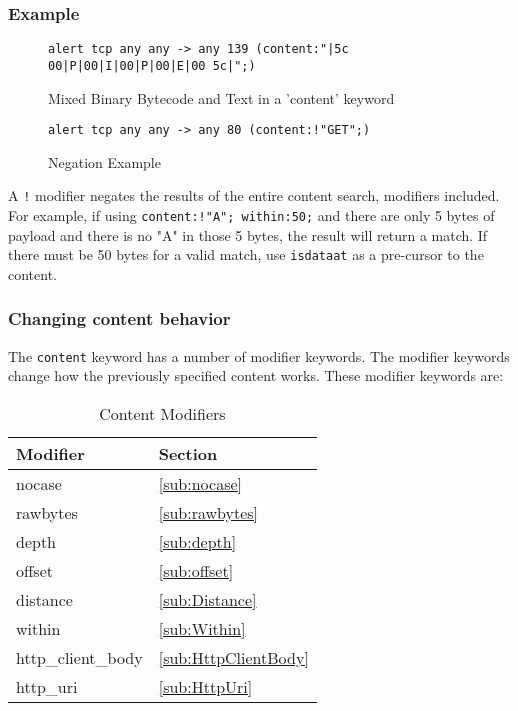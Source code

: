 \documentclass[english]{report}
\newenvironment{note}{
\samepage
    \vspace{10pt}{\textsf{
        {\hspace{7pt}\Huge{$\triangle$\hspace{-12.5pt}{\Large{$^!$}}}}\hspace{5pt}
        {\Large{NOTE}}
    }
    }
   \begin{center}
    \par\vspace{-17pt}

    \begin{lrbox}{\savepar}
    \begin{minipage}[r]{6in}
}
{
    \end{minipage}
    \end{lrbox}
    \fbox{
        \usebox{
            \savepar
	}
    }
    \par\vskip10pt
    \end{center}
}
\begin{document}
\subsubsection{Example}

\begin{figure}[!hbpt]
\begin{verbatim}
alert tcp any any -> any 139 (content:"|5c 00|P|00|I|00|P|00|E|00 5c|";)
\end{verbatim}
\caption{\label{mixed content example}Mixed Binary Bytecode and Text in a 'content' keyword}
\end{figure}

\begin{figure}[!hbpt]
\begin{verbatim}
alert tcp any any -> any 80 (content:!"GET";)
\end{verbatim}
\caption{\label{content negation example}Negation Example}
\end{figure}

\begin{note}
A \texttt{!} modifier negates the results of the entire content search,
modifiers included.  For example, if using \texttt{content:!"A"; within:50;}
and there are only 5 bytes of payload and there is no "A" in those 5 bytes,
the result will return a match.  If there must be 50 bytes for a valid
match, use \texttt{isdataat} as a pre-cursor to the content.
\end{note}

\subsubsection{Changing content behavior}

The \texttt{content} keyword has a number of modifier keywords.  The modifier keywords change 
how the previously specified content works.  These modifier keywords are:

\begin{center}
\begin{longtable}{|p{1in}|p{1in}|}
\caption{Content Modifiers \label{Content Modifiers}} \\
\hline 
Modifier & Section \\
\hline
\hline 
nocase & \ref{sub:nocase} \\
\hline
rawbytes & \ref{sub:rawbytes} \\
\hline
depth & \ref{sub:depth} \\
\hline 
offset & \ref{sub:offset} \\
\hline
distance & \ref{sub:Distance} \\
\hline 
within & \ref{sub:Within} \\
\hline
http\_client\_body & \ref{sub:HttpClientBody} \\
\hline 
http\_uri & \ref{sub:HttpUri} \\
\hline
\end{longtable}
\end{center}
\end{document}
